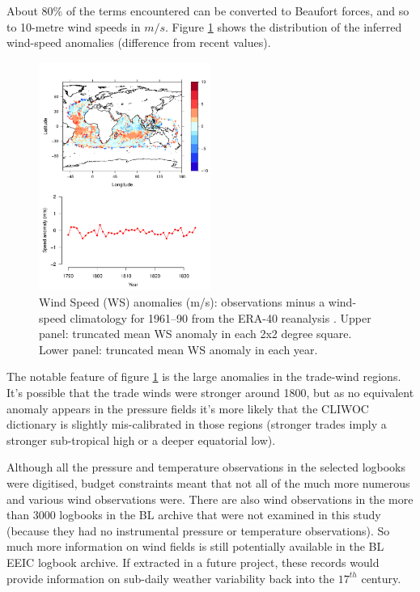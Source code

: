 \documentclass[CP]{copernicus}
\begin{document}
About 80\% of the terms encountered can be converted to Beaufort forces, and so to 10-metre wind speeds in $m/s$. Figure \ref{pwat3} shows the distribution of the inferred wind-speed anomalies (difference from recent values).
\begin{figure}[!hbp]
\begin{center}
\includegraphics[angle=0, width=0.5\textwidth]{../figures/wind_speeds}
\caption{Wind Speed (WS) anomalies (m/s): observations minus a wind-speed climatology for 1961--90 from the ERA-40 reanalysis \citep{uppala05reanalysis}. Upper panel: truncated mean WS anomaly in each 2x2 degree square. Lower panel: truncated mean WS anomaly in each year.}
\label{pwat3}
\end{center}
\end{figure}
The notable feature of figure \ref{pwat3} is the large anomalies in the trade-wind regions. It's possible that the trade winds were stronger around 1800, but as no equivalent anomaly appears in the pressure fields it's more likely that the CLIWOC dictionary is slightly mis-calibrated in those regions (stronger trades imply a stronger sub-tropical high or a deeper equatorial low).

Although all the pressure and temperature observations in the selected logbooks were digitised, budget constraints meant that not all of the much more numerous and various wind observations were. There are also wind observations in the more than 3000 logbooks in the BL archive that were not examined in this study (because they had no instrumental pressure or temperature observations). So much more information on wind fields is still potentially available in the BL EEIC logbook archive. If extracted in a future project, these records would provide information on sub-daily weather variability back into the $17^{th}$ century.
\end{document}
